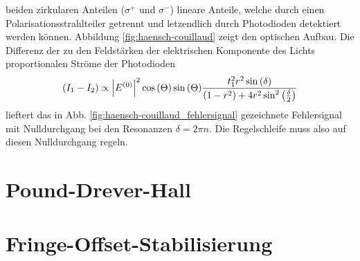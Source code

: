 beiden zirkularen Anteilen ($\sigma^+$ und $\sigma^-$) lineare Anteile, welche
durch einen Polarisationsstrahlteiler getrennt und letzendlich durch Photodioden
detektiert werden können. Abbildung \ref{fig:haensch-couillaud} zeigt den
optischen Aufbau. Die Differenz der zu den Feldstärken der elektrischen Komponente
des Lichts proportionalen Ströme der Photodioden
\begin{equation}\label{eq:servoschleife_fehlersignal}
	(I_1-I_2)\propto\left|E^{(0)}\right|^2\cos{(\Theta)}\sin{(\Theta)}\frac{t_1^2r^2\sin{(\delta)}}{(1-r^2)+4r^2\sin^2{\left(\frac{\delta}{2}\right)}}
\end{equation}
lieftert das in Abb. \ref{fig:haensch-couillaud_fehlersignal} gezeichnete
Fehlersignal mit Nulldurchgang bei den Resonanzen $\delta=2\pi n$. Die
Regelschleife muss also auf diesen Nulldurchgang regeln.

\section{Pound-Drever-Hall}\label{sec:pound-drever-hall}

\section{Fringe-Offset-Stabilisierung}\label{sec:fringe-offset-stabilisierung}


